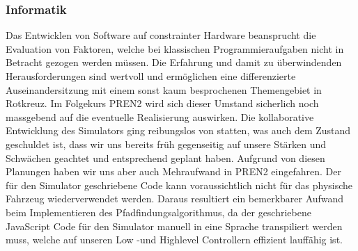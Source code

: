 \documentclass[main.tex]{subfiles} %
\begin{document}
\subsubsection{Informatik}
Das Entwicklen von Software auf constrainter Hardware beansprucht die
Evaluation von Faktoren, welche bei klassischen Programmieraufgaben nicht in
Betracht gezogen werden müssen. Die Erfahrung und damit zu überwindenden
Herausforderungen sind wertvoll und ermöglichen eine differenzierte
Auseinandersitzung mit einem sonst kaum besprochenen Themengebiet in Rotkreuz.
Im Folgekurs PREN2 wird sich dieser Umstand sicherlich noch massgebend auf die
eventuelle Realisierung auswirken. Die kollaborative Entwicklung des Simulators
ging reibungslos von statten, was auch dem Zustand geschuldet ist, dass wir uns
bereits früh gegenseitig auf unsere Stärken und Schwächen geachtet und
entsprechend geplant haben. Aufgrund von diesen Planungen haben wir uns aber
auch Mehraufwand in PREN2 eingefahren. Der für den Simulator geschriebene Code
kann voraussichtlich nicht für das physische Fahrzeug wiederverwendet werden.
Daraus resultiert ein bemerkbarer Aufwand beim Implementieren des
Pfadfindungsalgorithmus, da der geschriebene JavaScript Code für den Simulator
manuell in eine Sprache transpiliert werden muss, welche auf unseren Low -und
Highlevel Controllern effizient lauffähig ist.
\end{document}
